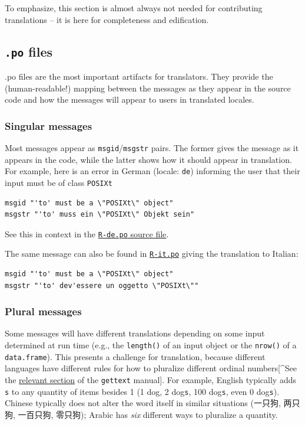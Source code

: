 \documentclass[
]{book}
\begin{document}
To emphasize, this section is almost always not needed for contributing translations -- it is here for
completeness and edification.

\hypertarget{po-files}{%
\subsection{\texorpdfstring{\texttt{.po} files}{.po files}}\label{po-files}}

.po files are the most important artifacts for translators. They provide the (human-readable!) mapping between
the messages as they appear in the source code and how the messages will appear to users in translated locales.

\hypertarget{singular-messages}{%
\subsubsection{Singular messages}\label{singular-messages}}

Most messages appear as \texttt{msgid}/\texttt{msgstr} pairs. The former gives the message as it appears in the code, while the
latter shows how it should appear in translation. For example, here is an error in German (locale: \texttt{de}) informing
the user that their input must be of class \texttt{POSIXt}

\begin{verbatim}
msgid "'to' must be a \"POSIXt\" object"
msgstr "'to' muss ein \"POSIXt\" Objekt sein"
\end{verbatim}

See this in context in the \href{https://svn.r-project.org/R/trunk/src/library/base/po/R-de.po}{\texttt{R-de.po} source file}.

The same message can also be found in
\href{https://svn.r-project.org/R/trunk/src/library/base/po/R-it.po}{\texttt{R-it.po}}
giving the translation to Italian:

\begin{verbatim}
msgid "'to' must be a \"POSIXt\" object"
msgstr "'to' dev'essere un oggetto \"POSIXt\""
\end{verbatim}

\hypertarget{plural-messages}{%
\subsubsection{Plural messages}\label{plural-messages}}

Some messages will have different translations depending on some input determined at run time (e.g., the \texttt{length()} of
an input object or the \texttt{nrow()} of a \texttt{data.frame}). This presents a challenge for translation, because different languages
have different rules for how to pluralize different ordinal
numbers{[}\^{}See the \href{https://www.gnu.org/software/gettext/manual/html_node/Plural-forms.html}{relevant section} of the \texttt{gettext} manual{]}.
For example, English typically adds \texttt{s} to any quantity of items besides 1 (1 dog, 2 dog\texttt{s}, 100 dog\texttt{s}, even 0 dog\texttt{s}).
Chinese typically does not alter the word itself in similar situations (一只狗, 两只狗, 一百只狗, 零只狗); Arabic has \emph{six}
different ways to pluralize a quantity.
\end{document}

